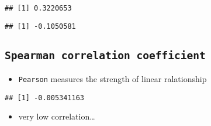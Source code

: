 \documentclass[
]{book}
\newenvironment{Shaded}{\begin{snugshade}}{\end{snugshade}}
\newcommand{\CommentTok}[1]{\textcolor[rgb]{0.56,0.35,0.01}{\textit{#1}}}
\newcommand{\FunctionTok}[1]{\textcolor[rgb]{0.00,0.00,0.00}{#1}}
\newcommand{\NormalTok}[1]{#1}
\newcommand{\SpecialCharTok}[1]{\textcolor[rgb]{0.00,0.00,0.00}{#1}}
\providecommand{\tightlist}{%
  \setlength{\itemsep}{0pt}\setlength{\parskip}{0pt}}
\theoremstyle{definition}
\theoremstyle{definition}
\theoremstyle{definition}
\theoremstyle{definition}
\theoremstyle{remark}
\begin{document}
\begin{verbatim}
## [1] 0.3220653
\end{verbatim}

\begin{Shaded}
\end{Shaded}

\begin{verbatim}
## [1] -0.1050581
\end{verbatim}

\hypertarget{spearman-correlation-coefficient}{%
\subsection{\texorpdfstring{\texttt{Spearman\ correlation\ coefficient}}{Spearman correlation coefficient}}\label{spearman-correlation-coefficient}}

\begin{itemize}
\tightlist
\item
  \texttt{Pearson} measures the strength of linear ralationship
\end{itemize}

\begin{Shaded}
\end{Shaded}

\begin{verbatim}
## [1] -0.005341163
\end{verbatim}

\begin{itemize}
\tightlist
\item
  very low correlation\ldots{}
\end{itemize}

\begin{Shaded}
\end{Shaded}
\end{document}
